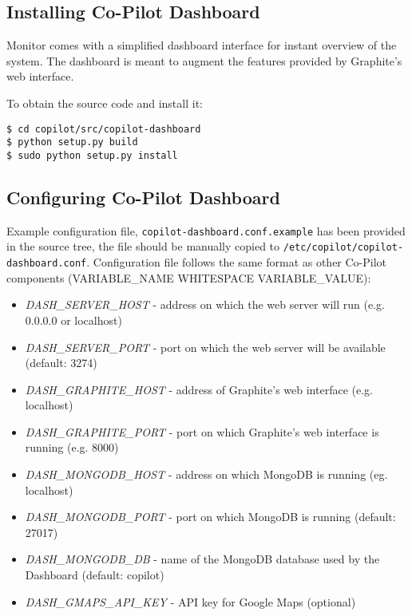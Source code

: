 \subsection{Installing Co-Pilot Dashboard}

Monitor comes with a simplified dashboard interface for instant overview of the system. The dashboard is meant to augment the features provided by Graphite's web interface.

To obtain the source code and install it:
\lstset{caption=Installing the Dashboard}
\begin{lstlisting}
$ cd copilot/src/copilot-dashboard
$ python setup.py build
$ sudo python setup.py install
\end{lstlisting}

\subsection{Configuring Co-Pilot Dashboard}

Example configuration file, \texttt{copilot-dashboard.conf.example} has been provided in the source tree, the file should be manually copied to \texttt{/etc/copilot/copilot-dashboard.conf}. Configuration file follows the same format as other Co-Pilot components (VARIABLE\_NAME WHITESPACE VARIABLE\_VALUE):

\begin{itemize}
  \item \emph{DASH\_SERVER\_HOST} - address on which the web server will run (e.g. 0.0.0.0 or localhost)
  \item \emph{DASH\_SERVER\_PORT} - port on which the web server will be available (default: 3274)
  \item \emph{DASH\_GRAPHITE\_HOST} - address of Graphite's web interface (e.g. localhost)
  \item \emph{DASH\_GRAPHITE\_PORT} - port on which Graphite's web interface is running (e.g. 8000)
  \item \emph{DASH\_MONGODB\_HOST} - address on which MongoDB is running (eg. localhost)
  \item \emph{DASH\_MONGODB\_PORT} - port on which MongoDB is running (default: 27017)
  \item \emph{DASH\_MONGODB\_DB} - name of the MongoDB database used by the Dashboard (default: copilot)
  \item \emph{DASH\_GMAPS\_API\_KEY} - API key for Google Maps (optional)
\end{itemize}

